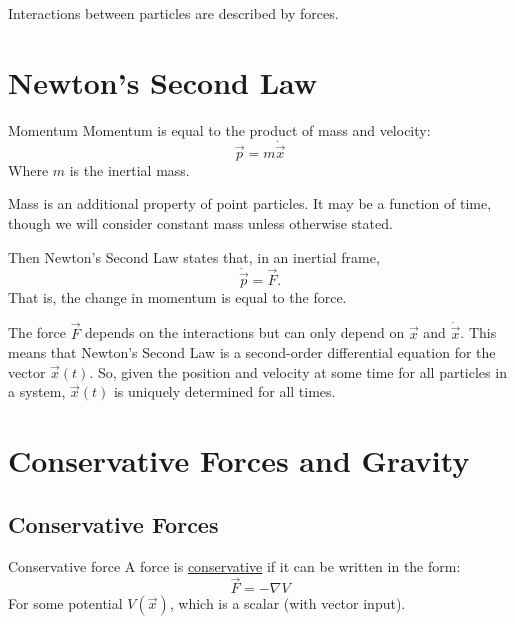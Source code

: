 \documentclass[../Main.tex]{subfiles}
\begin{document}
Interactions between particles are described by forces.
\section{Newton's Second Law}
\begin{definition}{Momentum}
    Momentum is equal to the product of mass and velocity:
    \begin{equation*}
        \vec{p} = m \dot{\vec{x}}
    \end{equation*}
    Where $m$ is the inertial mass.
\end{definition}
Mass is an additional property of point particles. It may be a function of time, though we will consider constant mass unless otherwise stated.\par
Then Newton's Second Law states that, in an inertial frame,
\begin{equation}
    \dot{\vec{p}} = \vec{F}.
    \label{eqnNewtonII}
\end{equation}
That is, the change in momentum is equal to the force.\par
The force $\vec{F}$ depends on the interactions but can only depend on $\vec{x}$ and $\dot{\vec{x}}$. This means that Newton's Second Law is a second-order differential equation for the vector $\vec{x}(t)$. So, given the position and velocity at some time for all particles in a system, $\vec{x}(t)$ is uniquely determined for all times.
\section{Conservative Forces and Gravity}
\subsection{Conservative Forces}
\begin{definition}{Conservative force}
    A force is \underline{conservative} if it can be written in the form:
    \begin{equation}
        \vec{F} = -\nabla V
        \label{eqnConservativeForce}
    \end{equation}
    For some potential $V(\vec{x})$, which is a scalar (with vector input).
\end{definition}
\end{document}
